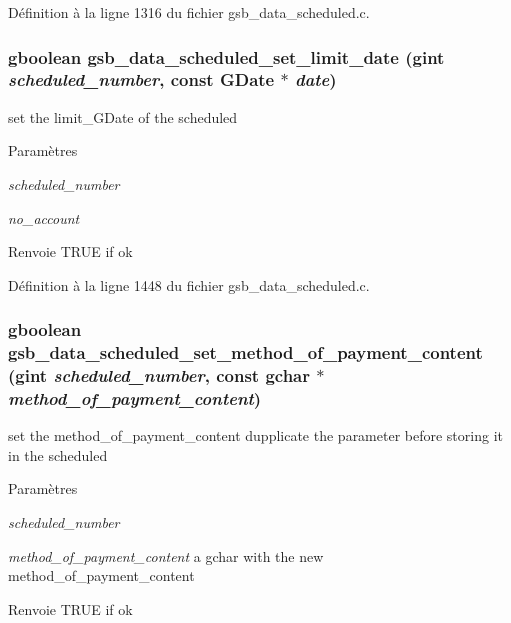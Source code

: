Définition à la ligne 1316 du fichier gsb\_\-data\_\-scheduled.c.

\subsubsection[{gsb\_\-data\_\-scheduled\_\-set\_\-limit\_\-date}]{\setlength{\rightskip}{0pt plus 5cm}gboolean gsb\_\-data\_\-scheduled\_\-set\_\-limit\_\-date (gint {\em scheduled\_\-number}, \/  const GDate $\ast$ {\em date})}\label{gsb__data__scheduled_8c_a2d738d94b95f2c386c98314393246571}
set the limit\_\-GDate of the scheduled


\begin{DoxyParams}{Paramètres}
\item[{\em scheduled\_\-number}]\item[{\em no\_\-account}]\end{DoxyParams}
\begin{DoxyReturn}{Renvoie}
TRUE if ok 
\end{DoxyReturn}


Définition à la ligne 1448 du fichier gsb\_\-data\_\-scheduled.c.

\subsubsection[{gsb\_\-data\_\-scheduled\_\-set\_\-method\_\-of\_\-payment\_\-content}]{\setlength{\rightskip}{0pt plus 5cm}gboolean gsb\_\-data\_\-scheduled\_\-set\_\-method\_\-of\_\-payment\_\-content (gint {\em scheduled\_\-number}, \/  const gchar $\ast$ {\em method\_\-of\_\-payment\_\-content})}\label{gsb__data__scheduled_8c_a3aff926c0e3cccd2731a1d023e770a34}
set the method\_\-of\_\-payment\_\-content dupplicate the parameter before storing it in the scheduled


\begin{DoxyParams}{Paramètres}
\item[{\em scheduled\_\-number}]\item[{\em method\_\-of\_\-payment\_\-content}]a gchar with the new method\_\-of\_\-payment\_\-content\end{DoxyParams}
\begin{DoxyReturn}{Renvoie}
TRUE if ok 
\end{DoxyReturn}


